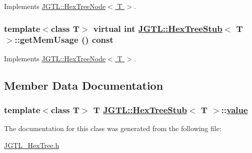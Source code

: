 Implements \hyperlink{class_j_g_t_l_1_1_hex_tree_node_2031e26f8fbf11d061e51cdd0a6c27eb}{JGTL::Hex\-Tree\-Node$<$ T $>$}.\hypertarget{class_j_g_t_l_1_1_hex_tree_stub_51ad9d73122cd1c356c1b8219941a6e7}{
\subsubsection[getMemUsage]{\setlength{\rightskip}{0pt plus 5cm}template$<$class T$>$ virtual int \hyperlink{class_j_g_t_l_1_1_hex_tree_stub}{JGTL::Hex\-Tree\-Stub}$<$ T $>$::get\-Mem\-Usage () const}}
\label{class_j_g_t_l_1_1_hex_tree_stub_51ad9d73122cd1c356c1b8219941a6e7}




Implements \hyperlink{class_j_g_t_l_1_1_hex_tree_node_9d71c1520ef1d80cf8ff292710e1994d}{JGTL::Hex\-Tree\-Node$<$ T $>$}.

\subsection{Member Data Documentation}
\hypertarget{class_j_g_t_l_1_1_hex_tree_stub_36b120793bf8032e9047c22875890a72}{
\subsubsection[value]{\setlength{\rightskip}{0pt plus 5cm}template$<$class T$>$ T \hyperlink{class_j_g_t_l_1_1_hex_tree_stub}{JGTL::Hex\-Tree\-Stub}$<$ T $>$::\hyperlink{class_j_g_t_l_1_1_hex_tree_stub_36b120793bf8032e9047c22875890a72}{value}}}
\label{class_j_g_t_l_1_1_hex_tree_stub_36b120793bf8032e9047c22875890a72}




The documentation for this class was generated from the following file:\begin{CompactItemize}
\item 
\hyperlink{_j_g_t_l___hex_tree_8h}{JGTL\_\-Hex\-Tree.h}\end{CompactItemize}
